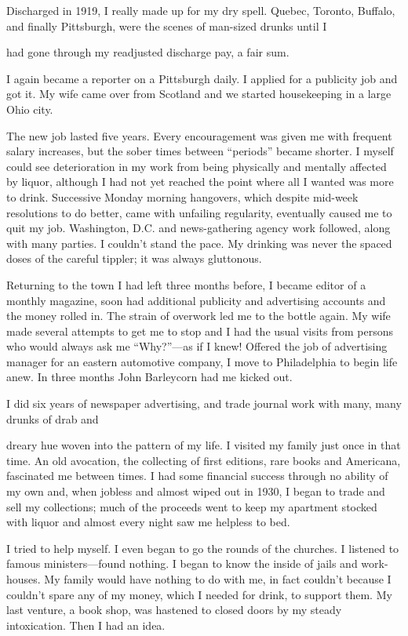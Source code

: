 \begin{biblechapter}
Discharged in 1919, I really made up for my dry spell. Quebec, Toronto, Buffalo, and finally Pittsburgh, were the scenes of man-sized drunks until I

had gone through my readjusted discharge pay, a fair sum.

I again became a reporter on a Pittsburgh daily. I applied for a publicity job and got it. My wife came over from Scotland and we started housekeeping in a large Ohio city.

The new job lasted five years. Every encouragement was given me with frequent salary increases, but the sober times between “periods” became shorter. I myself could see deterioration in my work from being physically and mentally affected by liquor, although I had not yet reached the point where all I wanted was more to drink. Successive Monday morning hangovers, which despite mid-week resolutions to do better, came with unfailing regularity, eventually caused me to quit my job. Washington, D.C. and news-gathering agency work followed, along with many parties. I couldn’t stand the pace. My drinking was never the spaced doses of the careful tippler; it was always gluttonous.

Returning to the town I had left three months before, I became editor of a monthly magazine, soon had additional publicity and advertising accounts and the money rolled in. The strain of overwork led me to the bottle again. My wife made several attempts to get me to stop and I had the usual visits from persons who would always ask me “Why?”—as if I knew! Offered the job of advertising manager for an eastern automotive company, I move to Philadelphia to begin life anew. In three months John Barleycorn had me kicked out.

I did six years of newspaper advertising, and trade journal work with many, many drunks of drab and

dreary hue woven into the pattern of my life. I visited my family just once in that time. An old avocation, the collecting of first editions, rare books and Americana, fascinated me between times. I had some financial success through no ability of my own and, when jobless and almost wiped out in 1930, I began to trade and sell my collections; much of the proceeds went to keep my apartment stocked with liquor and almost every night saw me helpless to bed.

I tried to help myself. I even began to go the rounds of the churches. I listened to famous ministers—found nothing. I began to know the inside of jails and work-houses. My family would have nothing to do with me, in fact couldn’t because I couldn’t spare any of my money, which I needed for drink, to support them. My last venture, a book shop, was hastened to closed doors by my steady intoxication. Then I had an idea.


\end{biblechapter}
